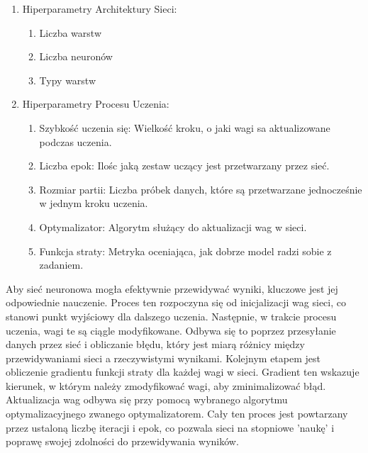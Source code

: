 \documentclass[a4paper,twoside,12pt]{book}
\begin{document}
\begin{enumerate}
  \item Hiperparametry Architektury Sieci:
        \begin{enumerate}
          \item Liczba warstw
          \item Liczba neuronów
          \item Typy warstw
        \end{enumerate}
  \item Hiperparametry Procesu Uczenia:
        \begin{enumerate}
          \item Szybkość uczenia się: Wielkość kroku, o jaki wagi sa aktualizowane podczas uczenia.
          \item Liczba epok: Ilośc jaką zestaw uczący jest przetwarzany przez sieć.
          \item Rozmiar partii: Liczba próbek danych, które są przetwarzane jednocześnie w jednym kroku uczenia.
          \item Optymalizator: Algorytm służący do aktualizacji wag w sieci.
          \item Funkcja straty: Metryka oceniająca, jak dobrze model radzi sobie z zadaniem.
        \end{enumerate}
\end{enumerate}

Aby sieć neuronowa mogła efektywnie przewidywać wyniki, kluczowe jest jej odpowiednie nauczenie. Proces ten rozpoczyna się od inicjalizacji wag sieci, co stanowi punkt wyjściowy dla dalszego uczenia. Następnie, w trakcie procesu uczenia, wagi te są ciągle modyfikowane. Odbywa się to poprzez przesyłanie danych przez sieć i obliczanie błędu, który jest miarą różnicy między przewidywaniami sieci a rzeczywistymi wynikami. Kolejnym etapem jest obliczenie gradientu funkcji straty dla każdej wagi w sieci. Gradient ten wskazuje kierunek, w którym należy zmodyfikować wagi, aby zminimalizować błąd. Aktualizacja wag odbywa się przy pomocą wybranego algorytmu optymalizacyjnego zwanego optymalizatorem. Cały ten proces jest powtarzany przez ustaloną liczbę iteracji i epok, co pozwala sieci na stopniowe 'naukę' i poprawę swojej zdolności do przewidywania wyników.\cite{bib:ksiazka_sieci_algorytmy}

\newpage
\end{document}
